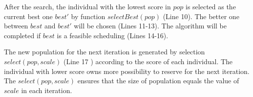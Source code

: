 \documentclass[10pt,journal]{IEEEtran}
\newcommand{\calS}{\mathcal{S}}
\theoremstyle{remark}
\begin{document}
After the search, the individual with the lowest score in $pop$ is selected as the current best one $best'$ by function $selectBest(pop)$ (Line 10).
The better one between $best$ and $best'$ will be chosen (Lines 11-13).
The algorithm will be completed if $best$ is a feasible scheduling (Lines 14-16).

The new population for the next iteration is generated by selection $select(pop,scale)$ (Line 17  ) according to the score of each individual.
The individual with lower score owns more possibility to reserve for the next iteration.
The $select(pop,scale)$ ensures that the size of population equals the value of $scale$ in each iteration.

\end{document}
